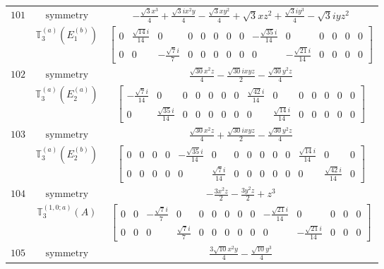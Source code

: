 \documentclass[fleqn,8pt,landscape]{jsarticle}
\begin{document}
\begin{longtable}{ccc}
$ 101 $ & $ \text{symmetry} $ & $ - \frac{\sqrt{3} x^{3}}{4} + \frac{\sqrt{3} i x^{2} y}{4} - \frac{\sqrt{3} x y^{2}}{4} + \sqrt{3} x z^{2} + \frac{\sqrt{3} i y^{3}}{4} - \sqrt{3} i y z^{2} $ \\
$  $ & $ \mathbb{T}_{3}^{(a)}(E_{1}^{(b)}) $ & $ \begin{bmatrix} 0 & \frac{\sqrt{14} i}{14} & 0 & 0 & 0 & 0 & 0 & 0 & - \frac{\sqrt{35} i}{14} & 0 & 0 & 0 & 0 & 0 \\ 0 & 0 & - \frac{\sqrt{7} i}{7} & 0 & 0 & 0 & 0 & 0 & 0 & - \frac{\sqrt{21} i}{14} & 0 & 0 & 0 & 0 \end{bmatrix} $ \\ \hline
$ 102 $ & $ \text{symmetry} $ & $ \frac{\sqrt{30} x^{2} z}{4} - \frac{\sqrt{30} i x y z}{2} - \frac{\sqrt{30} y^{2} z}{4} $ \\
$  $ & $ \mathbb{T}_{3}^{(a)}(E_{2}^{(a)}) $ & $ \begin{bmatrix} - \frac{\sqrt{7} i}{14} & 0 & 0 & 0 & 0 & 0 & 0 & \frac{\sqrt{42} i}{14} & 0 & 0 & 0 & 0 & 0 & 0 \\ 0 & \frac{\sqrt{35} i}{14} & 0 & 0 & 0 & 0 & 0 & 0 & \frac{\sqrt{14} i}{14} & 0 & 0 & 0 & 0 & 0 \end{bmatrix} $ \\ \hline
$ 103 $ & $ \text{symmetry} $ & $ \frac{\sqrt{30} x^{2} z}{4} + \frac{\sqrt{30} i x y z}{2} - \frac{\sqrt{30} y^{2} z}{4} $ \\
$  $ & $ \mathbb{T}_{3}^{(a)}(E_{2}^{(b)}) $ & $ \begin{bmatrix} 0 & 0 & 0 & 0 & - \frac{\sqrt{35} i}{14} & 0 & 0 & 0 & 0 & 0 & 0 & \frac{\sqrt{14} i}{14} & 0 & 0 \\ 0 & 0 & 0 & 0 & 0 & \frac{\sqrt{7} i}{14} & 0 & 0 & 0 & 0 & 0 & 0 & \frac{\sqrt{42} i}{14} & 0 \end{bmatrix} $ \\ \hline
$ 104 $ & $ \text{symmetry} $ & $ - \frac{3 x^{2} z}{2} - \frac{3 y^{2} z}{2} + z^{3} $ \\
$  $ & $ \mathbb{T}_{3}^{(1,0;a)}(A) $ & $ \begin{bmatrix} 0 & 0 & - \frac{\sqrt{7} i}{7} & 0 & 0 & 0 & 0 & 0 & 0 & - \frac{\sqrt{21} i}{14} & 0 & 0 & 0 & 0 \\ 0 & 0 & 0 & \frac{\sqrt{7} i}{7} & 0 & 0 & 0 & 0 & 0 & 0 & - \frac{\sqrt{21} i}{14} & 0 & 0 & 0 \end{bmatrix} $ \\ \hline
$ 105 $ & $ \text{symmetry} $ & $ \frac{3 \sqrt{10} x^{2} y}{4} - \frac{\sqrt{10} y^{3}}{4} $ \\

\end{longtable}
\end{document}

